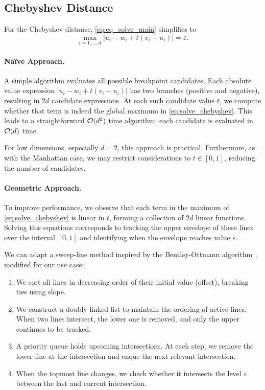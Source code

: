 \subsection{Chebyshev Distance}
\label{ssec:eq_chebyshev_distance}
For the Chebyshev distance, \cref{eq:eq_solve_main} simplifies to 
\begin{equation}
  \max_{i = 1,\dots, d} |u_i - w_i + t(v_i - u_i)| = \varepsilon.\label{eq:solve_chebyshev}
\end{equation}

\paragraph{Na\"ive Approach.}
A simple algorithm evaluates all possible breakpoint candidates. Each absolute value expression \(|u_i - w_i + t(v_i - u_i)|\) has two branches (positive and negative), resulting in \(2d\) candidate expressions. At each such candidate value \(t\), we compute whether that term is indeed the global maximum in \cref{eq:solve_chebyshev}. This leads to a straightforward \(\mathcal{O}(d^2)\) time algorithm: each candidate is evaluated in \(\mathcal{O}(d)\) time.

For low dimensions, especially \(d = 2\), this approach is practical. Furthermore, as with the Manhattan case, we may restrict considerations to \(t \in [0, 1]\), reducing the number of candidates.

\paragraph{Geometric Approach. }
To improve performance, we observe that each term in the maximum of \cref{eq:solve_chebyshev} is linear in \(t\), forming a collection of \(2d\) linear functions. Solving this equations corresponds to tracking the upper envelope of these lines over the interval \([0, 1]\) and identifying when the envelope reaches value \(\varepsilon\).

We can adapt a sweep-line method inspired by the Bentley-Ottmann algorithm~\cite{computational_geometry}, modified for our use case: 
\begin{enumerate}
	\item We sort all lines in decreasing order of their initial value (offset), breaking ties using slope.
	\item We construct a doubly linked list to maintain the ordering of active lines. When two lines intersect, the lower one is removed, and only the upper continues to be tracked.
	\item A priority queue holds upcoming intersections. At each step, we remove the lower line at the intersection and enque the next relevant intersection. 
	\item When the topmost line changes, we check whether it intersects the level \(\varepsilon\) between the last and current intersection.
\end{enumerate}

